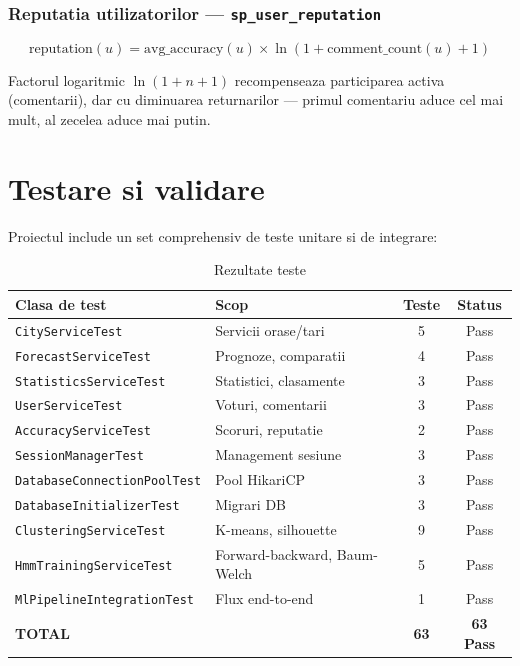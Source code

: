 \documentclass[12pt,a4paper]{article}
\begin{document}
\subsubsection{Reputatia utilizatorilor --- \texttt{sp\_user\_reputation}}

\begin{equation}
\text{reputation}(u) = \text{avg\_accuracy}(u) \times \ln(1 + \text{comment\_count}(u) + 1)
\end{equation}

Factorul logaritmic $\ln(1 + n + 1)$ recompenseaza participarea activa (comentarii), dar cu diminuarea returnarilor --- primul comentariu aduce cel mai mult, al zecelea aduce mai putin.

\vspace{0.8cm}

\section{Testare si validare}

Proiectul include un set comprehensiv de teste unitare si de integrare:

\begin{table}[H]
\centering
\begin{tabular}{@{}llcc@{}}
\toprule
\textbf{Clasa de test} & \textbf{Scop} & \textbf{Teste} & \textbf{Status} \\
\midrule
\texttt{CityServiceTest} & Servicii orase/tari & 5 & Pass \\
\texttt{ForecastServiceTest} & Prognoze, comparatii & 4 & Pass \\
\texttt{StatisticsServiceTest} & Statistici, clasamente & 3 & Pass \\
\texttt{UserServiceTest} & Voturi, comentarii & 3 & Pass \\
\texttt{AccuracyServiceTest} & Scoruri, reputatie & 2 & Pass \\
\texttt{SessionManagerTest} & Management sesiune & 3 & Pass \\
\texttt{DatabaseConnectionPoolTest} & Pool HikariCP & 3 & Pass \\
\texttt{DatabaseInitializerTest} & Migrari DB & 3 & Pass \\
\texttt{ClusteringServiceTest} & K-means, silhouette & 9 & Pass \\
\texttt{HmmTrainingServiceTest} & Forward-backward, Baum-Welch & 5 & Pass \\
\texttt{MlPipelineIntegrationTest} & Flux end-to-end & 1 & Pass \\
\midrule
\textbf{TOTAL} & & \textbf{63} & \textbf{63 Pass} \\
\bottomrule
\end{tabular}
\caption{Rezultate teste}
\end{table}
\end{document}
